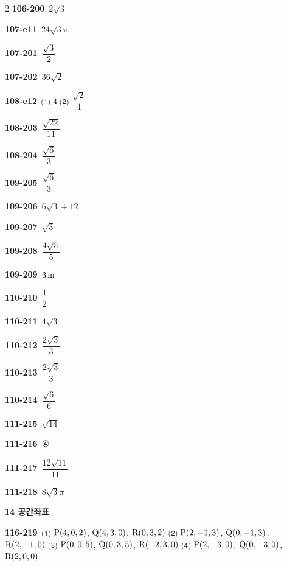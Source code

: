 \documentclass[10pt,a4paper]{article}
\newcommand{\pt}[1]{\mathrm{#1}}
\begin{document}
\begin{multicols}{2}
\noindent\textbf{106-200}\ $2\sqrt{3}$\par
\noindent\textbf{107-e11}\ $24\sqrt{3}\pi$\par
\noindent\textbf{107-201}\ $\dfrac{\sqrt{3}}{2}$\par
\noindent\textbf{107-202}\ $36\sqrt{2}$\par
\noindent\textbf{108-e12}\ ⑴ $4$ ⑵ $\dfrac{\sqrt{2}}{4}$\par
\noindent\textbf{108-203}\ $\dfrac{\sqrt{22}}{11}$\par
\noindent\textbf{108-204}\ $\dfrac{\sqrt{6}}{3}$\par
\noindent\textbf{109-205}\ $\dfrac{\sqrt{6}}{3}$\par
\noindent\textbf{109-206}\ $6\sqrt{3}+12$\par
\noindent\textbf{109-207}\ $\sqrt{3}$\par
\noindent\textbf{109-208}\ $\dfrac{4\sqrt{5}}{5}$\par
\noindent\textbf{109-209}\ $3\mkern3mu \mathrm{m}$\par
\noindent\textbf{110-210}\ $\dfrac{1}{2}$\par
\noindent\textbf{110-211}\ $4\sqrt{3}$\par
\noindent\textbf{110-212}\ $\dfrac{2\sqrt{3}}{3}$\par
\noindent\textbf{110-213}\ $\dfrac{2\sqrt{3}}{3}$\par
\noindent\textbf{110-214}\ $\dfrac{\sqrt{6}}{6}$\par
\noindent\textbf{111-215}\ $\sqrt{14}$\par
\noindent\textbf{111-216}\ ④\par
\noindent\textbf{111-217}\ $\dfrac{12\sqrt{11}}{11}$\par
\noindent\textbf{111-218}\ $8\sqrt{3}\pi$\par
\noindent\textbf{14 공간좌표}\par\smallskip
\noindent\textbf{116-219}\ ⑴ $\pt{P}(4{,}\mkern3mu\mathopen{}0{,}\mkern3mu\mathopen{}2)$, $\pt{Q}(4{,}\mkern3mu\mathopen{}3{,}\mkern3mu\mathopen{}0)$, $\pt{R}(0{,}\mkern3mu\mathopen{}3{,}\mkern3mu\mathopen{}2)$ ⑵ $\pt{P}(2{,}\mkern3mu\mathopen{}-1{,}\mkern3mu\mathopen{}3)$, $\pt{Q}(0{,}\mkern3mu\mathopen{}-1{,}\mkern3mu\mathopen{}3)$, $\pt{R}(2{,}\mkern3mu\mathopen{}-1{,}\mkern3mu\mathopen{}0)$ ⑶ $\pt{P}(0{,}\mkern3mu\mathopen{}0{,}\mkern3mu\mathopen{}5)$, $\pt{Q}(0{,}\mkern3mu\mathopen{}3{,}\mkern3mu\mathopen{}5)$, $\pt{R}(-2{,}\mkern3mu\mathopen{}3{,}\mkern3mu\mathopen{}0)$ ⑷ $\pt{P}(2{,}\mkern3mu\mathopen{}-3{,}\mkern3mu\mathopen{}0)$, $\pt{Q}(0{,}\mkern3mu\mathopen{}-3{,}\mkern3mu\mathopen{}0)$, $\pt{R}(2{,}\mkern3mu\mathopen{}0{,}\mkern3mu\mathopen{}0)$\par

\end{multicols}
\end{document}
